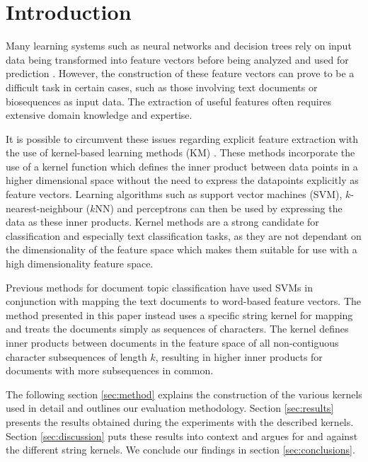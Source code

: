\section{Introduction} \label{sec:intro}

Many learning systems such as neural networks and decision trees rely on input data being transformed into feature vectors before being analyzed and used for prediction \cite{word2vec, glove}. However, the construction of these feature vectors can prove to be a difficult task in certain cases, such as those involving text documents or biosequences as input data. The extraction of useful features often requires extensive domain knowledge and expertise.

It is possible to circumvent these issues regarding explicit feature extraction with the use of kernel-based learning methods (KM) \cite{vapnik}. These methods incorporate the use of a kernel function which defines the inner product between data points in a higher dimensional space without the need to express the datapoints explicitly as feature vectors. Learning algorithms such as support vector machines (SVM), $k$-nearest-neighbour ($k$NN) and perceptrons can then be used by expressing the data as these inner products. Kernel methods are a strong candidate for classification and especially text classification tasks, as they are not dependant on the dimensionality of the feature space which makes them suitable for use with a high dimensionality feature space.

Previous methods for document topic classification \cite{wk} have used SVMs in conjunction with mapping the text documents to word-based feature vectors. The method presented in this paper instead uses a specific string kernel for mapping and treats the documents simply as sequences of characters. The kernel defines inner products between documents in the feature space of all non-contiguous character subsequences of length $k$, resulting in higher inner products for documents with more subsequences in common.

The following section \ref{sec:method} explains the construction of the various kernels used in detail and outlines our evaluation methodology. Section \ref{sec:results} presents the results obtained during the experiments with the described kernels. Section \ref{sec:discussion} puts these results into context and argues for and against the different string kernels. We conclude our findings in section \ref{sec:conclusions}.
